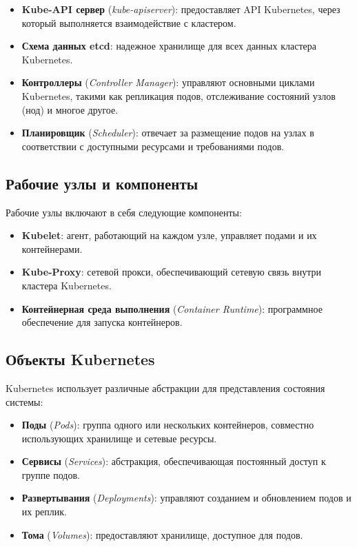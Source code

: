 \begin{itemize}
   \item \textbf{Kube-API сервер} (\textit{kube-apiserver}): предоставляет API
Kubernetes, через который выполняется взаимодействие с кластером.
   \item \textbf{Схема данных etcd}: надежное хранилище для всех данных
кластера Kubernetes.
   \item \textbf{Контроллеры} (\textit{Controller Manager}): управляют
основными циклами Kubernetes, такими как репликация подов, отслеживание
состояний узлов (нод) и многое другое.
   \item \textbf{Планировщик} (\textit{Scheduler}): отвечает за размещение
подов на узлах в соответствии с доступными ресурсами и требованиями подов.
\end{itemize}

\subsection*{Рабочие узлы и компоненты}
Рабочие узлы включают в себя следующие компоненты:

\begin{itemize}
   \item \textbf{Kubelet}: агент, работающий на каждом узле, управляет подами и
их контейнерами.
   \item \textbf{Kube-Proxy}: сетевой прокси, обеспечивающий сетевую связь
внутри кластера Kubernetes.
   \item \textbf{Контейнерная среда выполнения} (\textit{Container Runtime}):
программное обеспечение для запуска контейнеров.
\end{itemize}

\subsection*{Объекты Kubernetes}
Kubernetes использует различные абстракции для представления состояния системы:

\begin{itemize}
   \item \textbf{Поды} (\textit{Pods}): группа одного или нескольких
контейнеров, совместно использующих хранилище и сетевые ресурсы.
   \item \textbf{Сервисы} (\textit{Services}): абстракция, обеспечивающая
постоянный доступ к группе подов.
   \item \textbf{Развертывания} (\textit{Deployments}): управляют созданием и
обновлением подов и их реплик.
   \item \textbf{Тома} (\textit{Volumes}): предоставляют хранилище, доступное
для подов.
\end{itemize}

